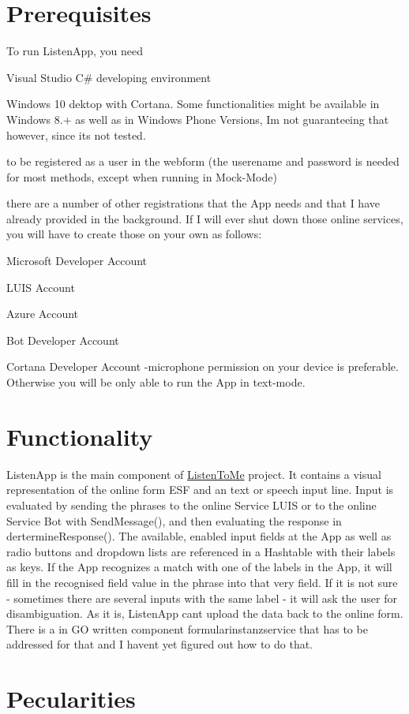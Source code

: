 \hypertarget{index_zero}{}\section{Prerequisites}\label{index_zero}
To run Listen\+App, you need
\begin{DoxyItemize}
\item Visual Studio C\# developing environment
\item Windows 10 dektop with Cortana. Some functionalities might be available in Windows 8.+ as well as in Windows Phone Versions, I\textquotesingle{}m not guaranteeing that however, since it\textquotesingle{}s not tested.
\item to be registered as a user in the webform (the userename and password is needed for most methods, except when running in Mock-\/\+Mode)
\item there are a number of other registrations that the App needs and that I have already provided in the background. If I will ever shut down those online services, you will have to create those on your own as follows\+:
\begin{DoxyEnumerate}
\item Microsoft Developer Account
\item L\+U\+IS Account
\item Azure Account
\item Bot Developer Account
\item Cortana Developer Account -\/microphone permission on your device is preferable. Otherwise you will be only able to run the App in text-\/mode.
\end{DoxyEnumerate}
\end{DoxyItemize}\hypertarget{index_first}{}\section{Functionality}\label{index_first}
Listen\+App is the main component of \hyperlink{namespace_listen_to_me}{Listen\+To\+Me} project. It contains a visual representation of the online form E\+SF and an text or speech input line. Input is evaluated by sending the phrases to the online Service L\+U\+IS or to the online Service Bot with Send\+Message(), and then evaluating the response in dertermine\+Response(). The available, enabled input fields at the App as well as radio buttons and dropdown lists are referenced in a Hashtable with their labels as keys. If the App recognizes a match with one of the labels in the App, it will fill in the recognised field value in the phrase into that very field. If it is not sure -\/ sometimes there are several inputs with the same label -\/ it will ask the user for disambiguation. As it is, Listen\+App can\textquotesingle{}t upload the data back to the online form. There is a in GO written component formularinstanzservice that has to be addressed for that and I haven\textquotesingle{}t yet figured out how to do that.\hypertarget{index_second}{}\section{Pecularities}\label{index_second}
